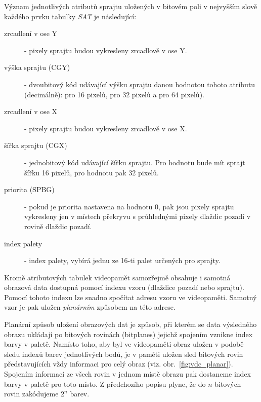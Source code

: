 \begin{description}
	Význam jednotlivých atributů sprajtu uložených v bitovém poli v nejvyšším
	slově každého prvku tabulky {\it SAT} je následující:

	\begin{description}
	\item[zrcadlení v ose Y] - pixely sprajtu budou vykresleny zrcadlově v ose Y.

	\item[výška sprajtu (CGY)] - dvoubitový kód udávající výšku sprajtu danou
		hodnotou tohoto atributu (decimálně):  pro 16 pixelů,
		 pro 32 pixelů a  pro 64 pixelů).

	\item[zrcadlení v ose X] - pixely sprajtu budou vykresleny zrcadlově v ose X.

	\item[šířka sprajtu (CGX)] - jednobitový kód udávající šířku sprajtu. Pro
		hodnotu  bude mít sprajt šířku 16 pixelů, pro hodnotu  pak 32 pixelů.

	\item[priorita (SPBG)] - pokud je priorita nastavena na hodnotu 0, pak jsou
		pixely sprajtu vykresleny jen v místech překryvu s průhlednými pixely
		dlaždic pozadí v rovině dlaždic pozadí.

	\item[index palety] - index palety, vybírá jednu ze 16-ti palet určených
		pro sprajty.
	\end{description}
\end{description}

Kromě atributových tabulek videopamět samozřejmě obsahuje i samotná obrazová
data dostupná pomocí indexu vzoru (dlaždice pozadí nebo sprajtu). Pomocí tohoto
indexu lze snadno spočítat adresu vzoru ve videopaměti. Samotný vzor je pak
uložen {\em planárním} způsobem na této adrese.

Planární způsob uložení obrazových dat je způsob, při kterém se data výsledného
obrazu ukládají po bitových rovinách (bitplanes) jejichž spojením vznikne index
barvy v paletě. Namísto toho, aby byl ve videopaměti obraz uložen v podobě
sledu indexů barev jednotlivých bodů, je v paměti uložen sled bitových rovin
představujících vždy informaci pro celý obraz (viz.
obr.~\ref{fig:vdc_planar}). Spojením informací ze všech rovin v jednom místě
obrazu pak dostaneme index barvy v paletě pro toto místo. Z předchozího popisu
plyne, že do $n$ bitových rovin zakódujeme $2^n$ barev.

